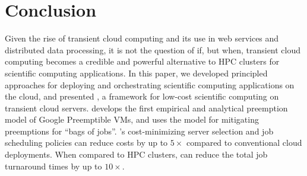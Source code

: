 

\section{Conclusion}
\label{sec:conclusion}
\vspace*{-0.2cm}
Given the rise of transient cloud computing and its use in web services and distributed data processing, it is not the question of if, but when, transient cloud computing becomes a credible and powerful alternative to HPC clusters for scientific computing applications. 
In this paper, we developed principled approaches for deploying and orchestrating scientific computing applications on the cloud, and presented \sysname, a framework for low-cost scientific computing on  transient cloud servers. 
\sysname develops the first empirical and analytical preemption model of Google Preemptible VMs, and uses the model for mitigating preemptions for ``bags of jobs''. 
\sysname's cost-minimizing server selection and job scheduling policies can reduce costs by up to $5\times$ compared to conventional cloud deployments.
When compared to HPC clusters, \sysname can reduce the total job turnaround times by up to $10\times$. 


